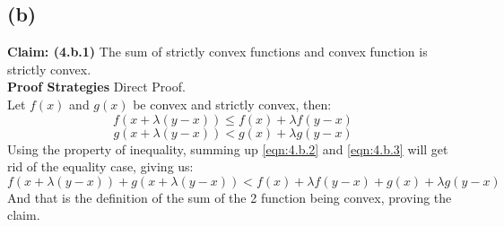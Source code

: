 \documentclass[]{article}
\begin{document}
\subsection*{(b)}
    \textbf{Claim: (4.b.1)} The sum of strictly convex functions and convex function is strictly convex.
    \\
    \textbf{Proof Strategies} Direct Proof.
    \\
    Let $f(x)$ and $g(x)$ be convex and strictly convex, then:
    \begin{equation*}\label{eqn:4.b.2}\tag{4.b.2}
        f(x + \lambda (y - x)) \le f(x) + \lambda f(y - x)
    \end{equation*}
    \begin{equation*}\tag{4.b.3}\label{eqn:4.b.3}
        g(x + \lambda (y - x)) < g(x) + \lambda g(y - x)
    \end{equation*}
    Using the property of inequality, summing up \ref{eqn:4.b.2} and \ref{eqn:4.b.3} will get rid of the equality case, giving us:
    \begin{equation*}
         f(x + \lambda (y - x)) + g(x + \lambda (y - x)) < f(x) + \lambda f(y - x) + g(x) + \lambda g(y - x)
    \end{equation*}
    And that is the definition of the sum of the 2 function being convex, proving the claim.
\end{document}
